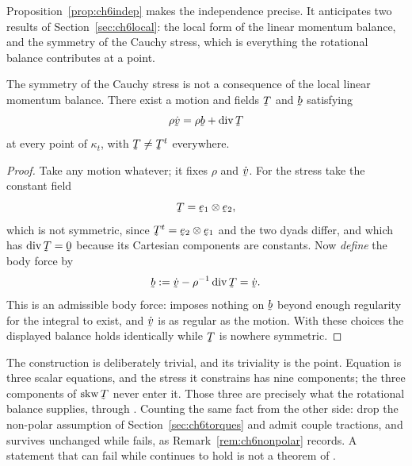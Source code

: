 Proposition~\ref{prop:ch6indep} makes the independence precise. It
anticipates two results of Section~\ref{sec:ch6local}: the local form
 of the linear momentum balance, and the symmetry
 of the Cauchy stress, which is everything the rotational
balance contributes at a point.

\begin{proposition}\label{prop:ch6indep}
The symmetry of the Cauchy stress is not a consequence of the local
linear momentum balance. There exist a motion and fields $\bT$ and $\bb$
satisfying
\[
   \rho\dot\bv=\rho\bb+\dvg\bT
\]
at every point of $\kappa_{t}$, with $\bT\neq\bT^{t}$ everywhere.
\end{proposition}

\begin{proof}
Take any motion whatever; it fixes $\rho$ and $\dot\bv$. For the stress
take the constant field
\[
   \bT=\be_{1}\otimes\be_{2} ,
\]
which is not symmetric, since $\bT^{t}=\be_{2}\otimes\be_{1}$ and the
two dyads differ, and which has $\dvg\bT=\bze$ because its Cartesian
components are constants. Now \emph{define} the body force by
\[
   \bb:=\dot\bv-\rho^{-1}\dvg\bT=\dot\bv .
\]
This is an admissible body force:  imposes nothing on $\bb$
beyond enough regularity for the integral to exist, and $\dot\bv$ is as
regular as the motion. With these choices the displayed balance holds
identically while $\bT$ is nowhere symmetric.
\end{proof}

The construction is deliberately trivial, and its triviality is the
point. Equation  is three scalar equations, and the stress it
constrains has nine components; the three components of $\Skw\bT$ never
enter it. Those three are precisely what the rotational balance
supplies, through . Counting the same fact from the other
side: drop the non-polar assumption of Section~\ref{sec:ch6torques} and
admit couple tractions, and  survives unchanged while
 fails, as Remark~\ref{rem:ch6nonpolar} records. A statement
that can fail while  continues to hold is not a theorem of
.

